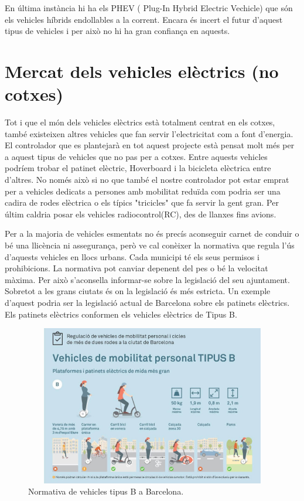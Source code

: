 En última instància hi ha els PHEV ( Plug-In Hybrid Electric Vechicle) que són els vehicles híbrids endollables a la corrent. Encara és incert el futur d'aquest tipus de vehicles i per això no hi ha gran confiança en aquests.

\section{Mercat dels vehicles elèctrics (no cotxes)}

Tot i que el món dels vehicles elèctrics està totalment centrat en els cotxes, també existeixen altres vehicles que fan servir l'electricitat com a font \newline d'energia. El controlador que es plantejarà en tot aquest projecte està pensat molt més per a aquest tipus de vehicles que no pas per a cotxes. Entre aquests vehicles podríem trobar el patinet elèctric, Hoverboard i la bicicleta elèctrica entre d'altres. No només això si no que també el nostre controlador pot estar emprat per a vehicles dedicats a persones amb mobilitat reduïda com podria ser una cadira de rodes elèctrica o els típics "tricicles" que fa servir la gent gran. Per últim caldria posar els vehicles radiocontrol(RC), des de llanxes fins avions. 

Per a la majoria de vehicles esmentats no és precís aconseguir carnet de conduir o bé una llicència ni assegurança, però ve cal conèixer la normativa que regula l'ús d'aquests vehicles en llocs urbans. Cada municipi té els seus permisos i prohibicions. La normativa pot canviar depenent del pes o bé la velocitat màxima. Per això s'aconsella informar-se sobre la legislació del seu ajuntament. Sobretot a les grans ciutats és on la legislació és més estricta. Un exemple d'aquest podria ser la legislació actual de Barcelona sobre els patinets elèctrics. Els patinets elèctrics conformen els vehicles elèctrics de Tipus B.

\begin{figure}[H]
		\centering
    	\includegraphics[width=12cm, height=7cm]{Marcteoric/normativaBCNpatinetselectrics.jpg}
    	\caption{Normativa de vehicles tipus B a Barcelona.}
\end{figure}

